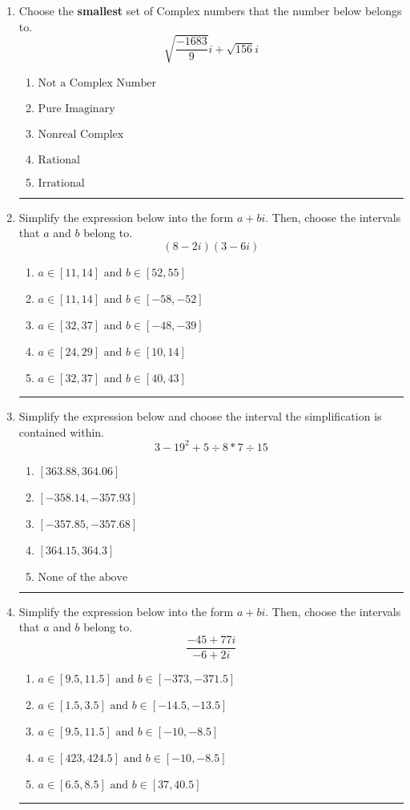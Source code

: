 \documentclass[14pt]{extbook}
\newcommand{\litem}[1]{\item#1\hspace*{-1cm}\rule{\textwidth}{0.4pt}}
\begin{document}
\begin{enumerate}
\litem{
Choose the \textbf{smallest} set of Complex numbers that the number below belongs to.\[ \sqrt{\frac{-1683}{9}} i+\sqrt{156}i \]\begin{enumerate}[label=\Alph*.]
\item \( \text{Not a Complex Number} \)
\item \( \text{Pure Imaginary} \)
\item \( \text{Nonreal Complex} \)
\item \( \text{Rational} \)
\item \( \text{Irrational} \)

\end{enumerate} }
\litem{
Simplify the expression below into the form $a+bi$. Then, choose the intervals that $a$ and $b$ belong to.\[ (8 - 2 i)(3 - 6 i) \]\begin{enumerate}[label=\Alph*.]
\item \( a \in [11, 14] \text{ and } b \in [52, 55] \)
\item \( a \in [11, 14] \text{ and } b \in [-58, -52] \)
\item \( a \in [32, 37] \text{ and } b \in [-48, -39] \)
\item \( a \in [24, 29] \text{ and } b \in [10, 14] \)
\item \( a \in [32, 37] \text{ and } b \in [40, 43] \)

\end{enumerate} }
\litem{
Simplify the expression below and choose the interval the simplification is contained within.\[ 3 - 19^2 + 5 \div 8 * 7 \div 15 \]\begin{enumerate}[label=\Alph*.]
\item \( [363.88, 364.06] \)
\item \( [-358.14, -357.93] \)
\item \( [-357.85, -357.68] \)
\item \( [364.15, 364.3] \)
\item \( \text{None of the above} \)

\end{enumerate} }
\litem{
Simplify the expression below into the form $a+bi$. Then, choose the intervals that $a$ and $b$ belong to.\[ \frac{-45 + 77 i}{-6 + 2 i} \]\begin{enumerate}[label=\Alph*.]
\item \( a \in [9.5, 11.5] \text{ and } b \in [-373, -371.5] \)
\item \( a \in [1.5, 3.5] \text{ and } b \in [-14.5, -13.5] \)
\item \( a \in [9.5, 11.5] \text{ and } b \in [-10, -8.5] \)
\item \( a \in [423, 424.5] \text{ and } b \in [-10, -8.5] \)
\item \( a \in [6.5, 8.5] \text{ and } b \in [37, 40.5] \)


\end{enumerate}}
\end{enumerate}
\end{document}
